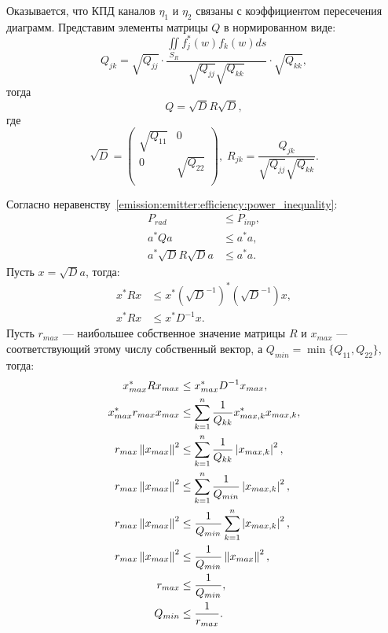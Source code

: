 Оказывается, что КПД каналов $\eta_1$ и $\eta_2$ связаны с коэффициентом пересечения диаграмм. Представим элементы матрицы $Q$ в нормированном виде:
\[
    Q_{jk}
    =
    \sqrt{Q_{jj}}
    \cdot
    \frac{\iint \limits_{S_R} f_j^*(w) f_k(w) ds}{\sqrt{Q_{jj}} \sqrt{Q_{kk}}}
    \cdot
    \sqrt{Q_{kk}} ,
\]
тогда
\[
    Q = \sqrt{D} R \sqrt{D} ,
\]
где
\[
    \sqrt{D}
    = \begin{pmatrix}
          \sqrt{Q_{11}} & 0             \\
          0             & \sqrt{Q_{22}} \\
    \end{pmatrix} ,
    \;
    R_{jk} = \frac{Q_{jk}}{\sqrt{Q_{jj}} \sqrt{Q_{kk}}} .
\]

Согласно неравенству~\eqref{emission:emitter:efficiency:power_inequality}:
\begin{align*}
    P_{rad}                   & \le P_{inp} , \\
    a^* Q a                   & \le a^* a, \\
    a^* \sqrt{D} R \sqrt{D} a & \le a^* a .
\end{align*}
Пусть $x = \sqrt{D} a$, тогда:
\begin{align*}
    x^* R x & \le x^* (\sqrt{D}^{-1})^* (\sqrt{D}^{-1}) x , \\
    x^* R x & \le x^* D^{-1} x .
\end{align*}
Пусть $r_{max}$ --- наибольшее собственное значение матрицы $R$ и $x_{max}$ --- соответствующий этому числу собственный вектор, а $Q_{min} = \min \{ Q_{11}, Q_{22} \}$,
тогда:
\begin{align*}
    x_{max}^* R x_{max} & \le x_{max}^* D^{-1} x_{max} , \\
    x_{max}^* r_{max} x_{max} & \le \sum_{k=1}^n \frac{1}{Q_{kk}} x_{max,k}^* x_{max,k} , \\
    r_{max} \left \| x_{max} \right \|^2 & \le \sum_{k=1}^n \frac{1}{Q_{kk}} \left | x_{max,k} \right |^2 , \\
    r_{max} \left \| x_{max} \right \|^2 & \le \sum_{k=1}^n \frac{1}{Q_{min}} \left | x_{max,k} \right |^2 , \\
    r_{max} \left \| x_{max} \right \|^2 & \le \frac{1}{Q_{min}} \sum_{k=1}^n \left | x_{max,k} \right |^2 , \\
    r_{max} \left \| x_{max} \right \|^2 & \le \frac{1}{Q_{min}} \left \| x_{max} \right \|^2 , \\
    r_{max} & \le \frac{1}{Q_{min}} , \\
    Q_{min} & \le \frac{1}{r_{max}} .
\end{align*}

